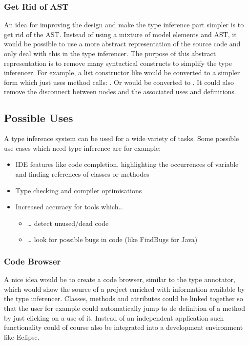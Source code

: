 \documentclass[12pt,halfparskip,DIV11,BCOR10mm]{scrreprt}
\begin{document}
\subsubsection{Get Rid of AST}
\label{aast}

An idea for improving the design and make the type inference part simpler is to get rid of the AST. Instead of using a mixture of model elements and AST, it would be possible to use a more abstract representation of the source code and only deal with this in the type inferencer. The purpose of this abstract representation is to remove many syntactical constructs to simplify the type inferencer. For example, a list constructor like  would be converted to a simpler form which just uses method calls: . Or  would be converted to . It could also remove the disconnect between  nodes and the associated uses and definitions.

\subsection{Possible Uses}

A type inference system can be used for a wide variety of tasks. Some possible use cases which need type inference are for example:

\begin{itemize}
    \item IDE features like code completion, highlighting the occurrences of variable and finding references of classes or methodes
    \item Type checking and compiler optimisations
    \item Increased accuracy for tools which…
    \begin{itemize}
        \item … detect unused/dead code
        \item … look for possible bugs in code (like FindBugs for Java)
    \end{itemize}  
\end{itemize}

\subsubsection{Code Browser}

A nice idea would be to create a code browser, similar to the type annotator, which would show the source of a project enriched with information available by the type inferencer. Classes, methods and attributes could be linked together so that the user for example could automatically jump to de definition of a method by just clicking on a use of it. Instead of an independent application such functionality could of course also be integrated into a development environment like Eclipse.
\end{document}
